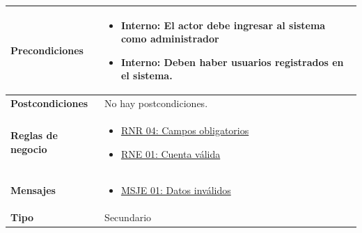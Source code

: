\begin{center}
\begin{longtable}{| p{3.5cm} | p{11.5cm} |}
        \hline  
          \textbf{Precondiciones} & 
            \begin{itemize}
                \item \textbf{Interno:} El actor debe ingresar al sistema como administrador
                \item \textbf{Interno:} Deben haber usuarios registrados en el sistema.
              \end{itemize} \\
        \hline  
          \textbf{Postcondiciones} & No hay postcondiciones. \\
        \hline
          \textbf{Reglas de negocio} & 
              \begin{itemize}
                  \item {\hyperref[rnr_04]{RNR 04: Campos obligatorios}}
                 \item {\hyperref[rnr_01]{RNE 01: Cuenta válida}}
              \end{itemize} \\
        \hline
          \textbf{Mensajes} & 
              \begin{itemize}
                 \item {\hyperref[msje_01]{MSJE 01: Datos inválidos}}
              \end{itemize} \\
        \hline
          \textbf{Tipo} & Secundario \\
        \hline      
  \end{longtable}
\end{center}
\endgroup

